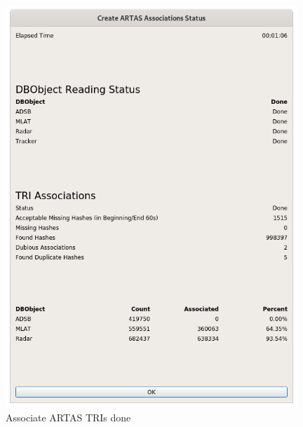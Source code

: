 \begin{figure}[H]
  \center
    \includegraphics[width=11cm]{figures/artas_assoc_done.png}
  \caption{Associate ARTAS TRIs done}
\end{figure}


